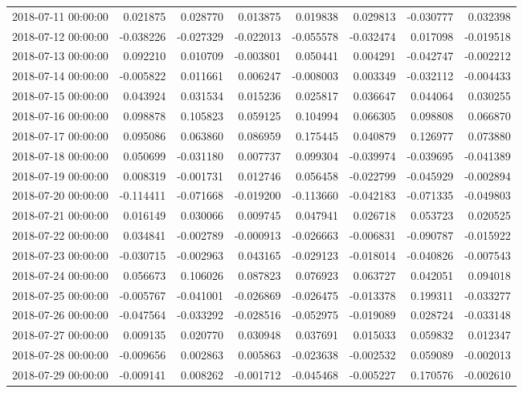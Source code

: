 \begin{tabular}{lrrrrrrr}
2018-07-11 00:00:00 & 0.021875 & 0.028770 & 0.013875 & 0.019838 & 0.029813 & -0.030777 & 0.032398 \\
2018-07-12 00:00:00 & -0.038226 & -0.027329 & -0.022013 & -0.055578 & -0.032474 & 0.017098 & -0.019518 \\
2018-07-13 00:00:00 & 0.092210 & 0.010709 & -0.003801 & 0.050441 & 0.004291 & -0.042747 & -0.002212 \\
2018-07-14 00:00:00 & -0.005822 & 0.011661 & 0.006247 & -0.008003 & 0.003349 & -0.032112 & -0.004433 \\
2018-07-15 00:00:00 & 0.043924 & 0.031534 & 0.015236 & 0.025817 & 0.036647 & 0.044064 & 0.030255 \\
2018-07-16 00:00:00 & 0.098878 & 0.105823 & 0.059125 & 0.104994 & 0.066305 & 0.098808 & 0.066870 \\
2018-07-17 00:00:00 & 0.095086 & 0.063860 & 0.086959 & 0.175445 & 0.040879 & 0.126977 & 0.073880 \\
2018-07-18 00:00:00 & 0.050699 & -0.031180 & 0.007737 & 0.099304 & -0.039974 & -0.039695 & -0.041389 \\
2018-07-19 00:00:00 & 0.008319 & -0.001731 & 0.012746 & 0.056458 & -0.022799 & -0.045929 & -0.002894 \\
2018-07-20 00:00:00 & -0.114411 & -0.071668 & -0.019200 & -0.113660 & -0.042183 & -0.071335 & -0.049803 \\
2018-07-21 00:00:00 & 0.016149 & 0.030066 & 0.009745 & 0.047941 & 0.026718 & 0.053723 & 0.020525 \\
2018-07-22 00:00:00 & 0.034841 & -0.002789 & -0.000913 & -0.026663 & -0.006831 & -0.090787 & -0.015922 \\
2018-07-23 00:00:00 & -0.030715 & -0.002963 & 0.043165 & -0.029123 & -0.018014 & -0.040826 & -0.007543 \\
2018-07-24 00:00:00 & 0.056673 & 0.106026 & 0.087823 & 0.076923 & 0.063727 & 0.042051 & 0.094018 \\
2018-07-25 00:00:00 & -0.005767 & -0.041001 & -0.026869 & -0.026475 & -0.013378 & 0.199311 & -0.033277 \\
2018-07-26 00:00:00 & -0.047564 & -0.033292 & -0.028516 & -0.052975 & -0.019089 & 0.028724 & -0.033148 \\
2018-07-27 00:00:00 & 0.009135 & 0.020770 & 0.030948 & 0.037691 & 0.015033 & 0.059832 & 0.012347 \\
2018-07-28 00:00:00 & -0.009656 & 0.002863 & 0.005863 & -0.023638 & -0.002532 & 0.059089 & -0.002013 \\
2018-07-29 00:00:00 & -0.009141 & 0.008262 & -0.001712 & -0.045468 & -0.005227 & 0.170576 & -0.002610 \\

\end{tabular}
